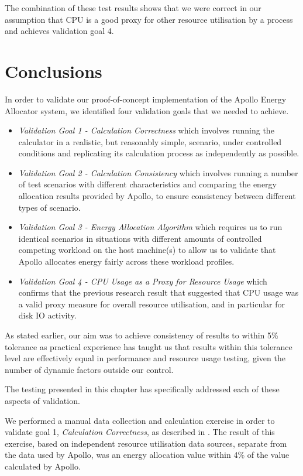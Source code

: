 The combination of these test results shows that we were correct in our assumption that CPU is a good proxy for other resource utilisation by a process and achieves validation goal 4.

\section{Conclusions}

In order to validate our proof-of-concept implementation of the Apollo Energy Allocator system, we identified four validation goals that we needed to achieve.

\begin{itemize}
	\item \textit{Validation Goal 1 - Calculation Correctness} which involves running the calculator in a realistic, but reasonably simple, scenario, under controlled conditions and replicating its calculation process as independently as possible.
	\item \textit{Validation Goal 2 - Calculation Consistency} which involves running a number of test scenarios with different characteristics and comparing the energy allocation results provided by Apollo, to ensure consistency between different types of scenario.
	\item \textit{Validation Goal 3 - Energy Allocation Algorithm} which requires us to run identical scenarios in situations with different amounts of controlled competing workload on the host machine(s) to allow us to validate that Apollo allocates energy fairly across these workload profiles.
	\item \textit{Validation Goal 4 - CPU Usage as a Proxy for Resource Usage} which confirms that the previous research result that suggested that CPU usage was a valid proxy measure for overall resource utilisation, and in particular for disk IO activity.
\end{itemize}

As stated earlier, our aim was to achieve consistency of results to within 5\% tolerance as practical experience has taught us that results within this tolerance level are effectively equal in performance and resource usage testing, given the number of dynamic factors outside our control.

The testing presented in this chapter has specifically addressed each of these aspects of validation.

We performed a manual data collection and calculation exercise in order to validate goal 1, \textit{Calculation Correctness}, as described in .  The result of this exercise, based on independent resource utilisation data sources, separate from the data used by Apollo, was an energy allocation value within 4\%  of the value calculated by Apollo.

